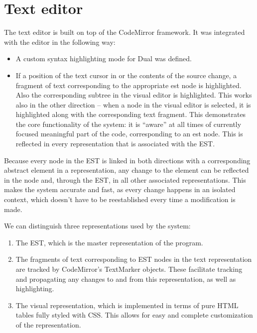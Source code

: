 \section{Text editor}
The text editor is built on top of the CodeMirror
framework\cite{codemirror_site}. It was integrated with the
editor in the following way:
\begin{itemize}
    \item A custom syntax highlighting mode for Dual was defined.  %
    \item If a position of the text cursor in or the contents of the source
      change, a fragment of text corresponding to the appropriate \acrshort{est}
      node is highlighted. Also the corresponding subtree in the visual editor
      is highlighted. This works also in the other direction -- when a node in
      the visual editor is selected, it is highlighted along with the
      corresponding text fragment. This demonstrates the core functionality of
      the system: it is ``aware'' at all times of currently focused meaningful
      part of the code, corresponding to an \acrshort{est} node. This is
      reflected in every representation that is associated with the EST.

\end{itemize}
Because every node in the EST is linked in both directions with a corresponding
abstract element in a representation, any change to the element can be reflected
in the node and, through the EST, in all other associated representations. This
makes the system accurate and fast, as every change happens in an isolated
context, which doesn't have to be reestablished every time a modification is
made.

We can distinguish three representations used by the system:
\begin{enumerate}
    \item The EST, which is the master representation of the program.
    \item The fragments of text corresponding to EST nodes in the text
      representation are tracked by CodeMirror's TextMarker objects. These
      facilitate tracking and propagating any changes to and from this
      representation, as well as highlighting.
    \item The visual representation, which is implemented in terms of pure HTML
      tables fully styled with CSS. This allows for easy and complete
      customization of the representation.
\end{enumerate}

